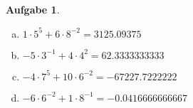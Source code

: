 \documentclass[12pt,fleqn]{article}
\theoremstyle{aufg}
\newtheorem{aufgabe}{Aufgabe}
\theoremstyle{bsp}
\begin{document}
\begin{flushleft}
\begin{aufgabe}
\begin{multicols}{2} 
\begin{enumerate}[a)] 
\item 
$1\cdot5^{5}+6\cdot8^{-2}=$$3125.09375$
\item 
$-5\cdot3^{-1}+4\cdot4^{2}=$$62.3333333333$
\item 
$-4\cdot7^{5}+10\cdot6^{-2}=$$-67227.7222222$
\item 
$-6\cdot6^{-2}+1\cdot8^{-1}=$$-0.0416666666667$
\end{enumerate} 
\end{multicols} 
\end{aufgabe} 
\end{flushleft} 
\end{document}
